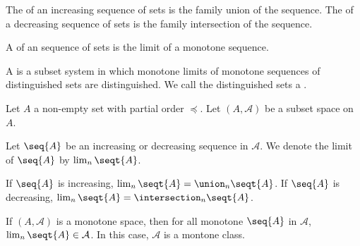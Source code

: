 
\sbasic































\sstart
{}





The
of an increasing sequence
of sets is the family
union of the sequence.
The
of a decreasing sequence
of sets is the family
intersection of the sequence.

A
of an sequence of sets
is the limit of a
monotone sequence.

A
is a
subset system in which
monotone limits of
 monotone sequences
of distinguished sets are distinguished.
We call the distinguished sets a
.


Let $A$ a non-empty set with
partial order $\preceq$.
Let $(A, \mathcal{A})$ be a
subset space on $A$.

Let $\seq{A}$ be an increasing
or decreasing sequence in $\mathcal{A}$.
We denote the limit of $\seq{A}$
by $\lim_{n} \seqt{A}$.

If $\seq{A}$ is increasing,
$\lim_n \seqt{A} = \union_{n} \seqt{A}$.
If $\seq{A}$ is decreasing,
$\lim_n \seqt{A} = \intersection_{n} \seqt{A}$.

If $(A, \mathcal{A})$ is a monotone space,
then for all monotone
$\seq{A}$ in $\mathcal{A}$,
$\lim_{n} \seqt{A} \in \mathcal{A}$.
In this case, $\mathcal{A}$ is a montone class.
\strats
